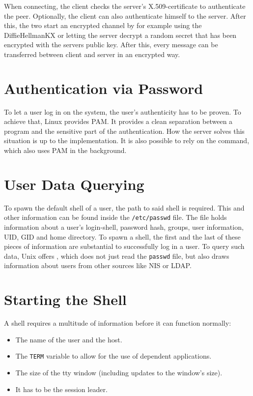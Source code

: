 \documentclass[10pt,a4paper,titlepage,twoside,english,final]{zhawreprt}
\begin{document}
When connecting, the client checks the server's \gls{X.509}-certificate to authenticate the peer.
Optionally, the client can also authenticate himself to the server.
After this, the two start an encrypted channel by for example using the \gls{DiffieHellmanKX} or letting the server decrypt a random secret that has been encrypted with the servers public key.
After this, every message can be transferred between client and server in an encrypted way.

\section{Authentication via Password}\label{sec:DesignAuthViaPw}
To let a user log in on the system, the user's authenticity has to be proven.
To achieve that, \gls{Linux} provides \gls{PAM}.
It provides a clean separation between a program and the sensitive part of the authentication.
How the server solves this situation is up to the implementation.
It is also possible to rely on the \cite{login} command, which also uses \gls{PAM} in the background.

\section{User Data Querying}\label{sec:DesignUserDataQuerying}
To spawn the default \gls{shell} of a user, the path to said \gls{shell} is required.
This and other information can be found inside the \texttt{/etc/passwd} file.
The file holds information about a user's \gls{login}-\gls{shell}, password hash, groups, user information, \gls{UID}, \gls{GID} and home directory.
To spawn a \gls{shell}, the first and the last of these pieces of information are substantial to successfully log in a user.
To query such data, \gls{Unix} offers \cite{getpw}, which does not just read the \texttt{passwd} file, but also draws information about users from other sources like \gls{NIS} or \gls{LDAP}.


\section{Starting the Shell}\label{sec:DesignStartingTheShell}
A \gls{shell} requires a multitude of information before it can function normally:
\begin{itemize}
\item The name of the user and the host.
\item The \texttt{TERM} variable to allow for the use of \cite{ncurses} dependent applications.
\item The size of the \gls{tty} window (including updates to the window's size).
\item It has to be the session leader.
\end{itemize}
\end{document}
